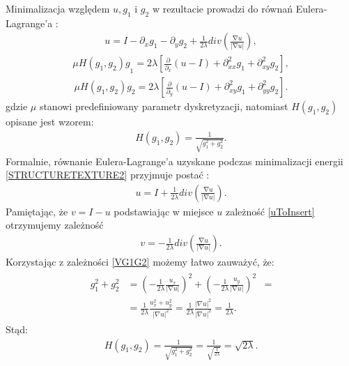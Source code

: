 \documentclass[12pt, twoside, openany]{report}
\theoremstyle{definition}
\begin{document}
Minimalizacja względem $u, g_1$ i $g_2$ w rezultacie prowadzi do równań Eulera-Lagrange'a \cite{vese2003modeling}:
\begin{align}
u=I-{\partial }_xg_1-{\partial }_yg_2+\frac{1}{2\lambda }div\left(\frac{\mathrm{\nabla }u}{\left|\mathrm{\nabla }u\right|}\right),
\label{EL1}
\end{align}
\begin{align}
{\mu H\left(g_1,g_2\right)g}_1=2\lambda \left[\frac{\partial }{{\partial }_x}\left(u-I\right)+{\partial }^2_{xx}g_1+{\partial }^2_{xy}g_2\right],
\label{EL2}
\end{align}
\begin{align}
\mu H\left(g_1,g_2\right)g_2=2\lambda \left[\frac{\partial }{{\partial }_y}\left(u-I\right)+{\partial }^2_{xy}g_1+{\partial }^2_{yy}g_2\right].
\label{EL3}
\end{align}
gdzie $\mu$ stanowi predefiniowany parametr dyskretyzacji, natomiast $H\left(g_1,g_2\right)$ opisane jest wzorem:
\begin{align}
H\left(g_1,g_2\right)=\frac{1}{\sqrt{g^2_1+g^2_2}}.
\end{align}
Formalnie, równanie Eulera-Lagrange'a uzyskane podczas minimalizacji energii \eqref{STRUCTURETEXTURE2} przyjmuje postać \cite{vese2003modeling}:
\begin{align}
u=I+\frac{1}{2\lambda }div\left(\frac{\mathrm{\nabla }u}{\left|\mathrm{\nabla }u\right|}\right).
\label{uToInsert}
\end{align}
Pamiętając, że $v = I -u$ podstawiając w miejsce $u$ zależność \eqref{uToInsert} otrzymujemy zależność
\begin{align}
v=-\frac{1}{2\lambda }div\left(\frac{\mathrm{\nabla }u}{\left|\mathrm{\nabla }u\right|}\right).
\end{align}
Korzystając z zależności \eqref{VG1G2} możemy łatwo zauważyć, że:
\begin{align}
\begin{aligned}
g^2_1+g^2_2 & = 
\left(-\frac{1}{2\lambda }\frac{u_x}{\left|\mathrm{\nabla }u\right|}\right)^2 +  \left(-\frac{1}{2\lambda }\frac{u_y}{\left|\mathrm{\nabla }u\right|}\right)^2 &=\\
&= \frac{1}{2\lambda} \frac{u_x^2 + u_y^2 }{|\nabla u|^2} = \frac{1}{2\lambda} \frac{|\nabla u|^2}{|\nabla u|^2} = \frac{1}{2\lambda}.
\end{aligned}
\end{align}
Stąd:
\begin{align}
H\left(g_1,g_2\right)=\frac{1}{\sqrt{g^2_1+g^2_2}} = \frac{1}{\sqrt{\frac{1}{2\lambda}}} = \sqrt{2\lambda}.
\end{align}
\end{document}
